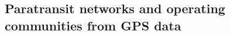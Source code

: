 \documentclass{elsarticle}
\begin{document}


\subsection{Paratransit networks and operating communities from GPS data}
\label{sec:rw_gps}
\end{document}

